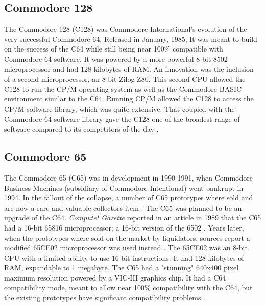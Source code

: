 \subsection{Commodore 128}
The Commodore 128 (C128) was Commodore International's evolution of the very successful Commodore 64. Released in January, 1985, It was meant to build on the success of the C64 while still being near 100\% compatible with Commodore 64 software. It was powered by a more powerful 8-bit 8502 microprocessor and had 128 kilobytes of RAM. An innovation was the inclusion of a second microprocessor, an 8-bit Zilog Z80. This second CPU allowed the C128 to run the CP/M operating system as well as the Commodore BASIC environment similar to the C64. Running CP/M allowed the C128 to access the CP/M software library, which was quite extensive. That coupled with the Commodore 64 software library gave the C128 one of the broadest range of software compared to its competitors of the day
\cite{RN32}.

\subsection{Commodore 65}
The Commodore 65 (C65) was in development in 1990-1991, when Commodore Business Machines (subsidiary of Commodore Intentional) went bankrupt in 1994. In the fallout of the collapse, a number of C65 prototypes where sold and are now a rare and valuable collectors item \cite{RN132}. The C65 was planned to be an upgrade of the C64. \textit{Compute! Gazette} reported in an article in 1989 that the C65 had a 16-bit 65816 microprocessor; a 16-bit version of the 6502 
\cite{RN31}. Years later, when the prototypes where sold on the market by liquidators, sources report a modified 65CE02 microprocessor was used instead
\cite{RN30}
\cite{RN78}. The 65CE02 was an 8-bit CPU with a limited ability to use 16-bit instructions. It had 128 kilobytes of RAM, expandable to 1 megabyte. The C65 had a "stunning" 640x400 pixel maximum resolution 
\cite{RN31} powered by a VIC-III graphics chip. It had a C64 compatibility mode, meant to allow near 100\% compatibility with the C64, but the existing prototypes have significant compatibility problems
\cite{RN30}. 

